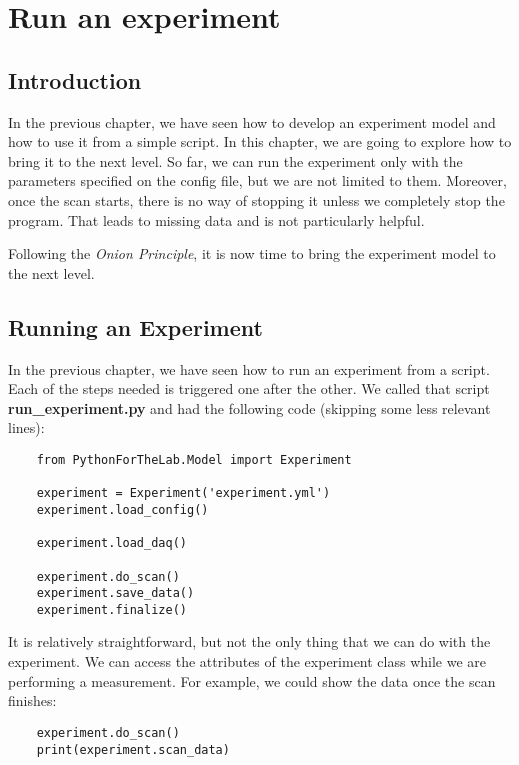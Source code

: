 \chapter{Run an experiment}\label{chapter:run-experiment}


\section{Introduction}
In the previous chapter, we have seen how to develop an experiment model and how to use it from a simple script. In this chapter, we are going to explore how to bring it to the next level. So far, we can run the experiment only with the parameters specified on the config file, but we are not limited to them. Moreover, once the scan starts, there is no way of stopping it unless we completely stop the program. That leads to missing data and is not particularly helpful.

Following the \emph{Onion Principle}, it is now time to bring the experiment model to the next level.


\section{Running an Experiment}\label{sec:running-experiment}
In the previous chapter, we have seen how to run an experiment from a script. Each of the steps needed is triggered one after the other. We called that script \textbf{run\_experiment.py} and had the following code (skipping some less relevant lines):

\begin{verbatim}
    from PythonForTheLab.Model import Experiment

    experiment = Experiment('experiment.yml')
    experiment.load_config()

    experiment.load_daq()

    experiment.do_scan()
    experiment.save_data()
    experiment.finalize()
\end{verbatim}

It is relatively straightforward, but not the only thing that we can do with the experiment. We can access the attributes of the experiment class while we are performing a measurement. For example, we could show the data once the scan finishes:

\begin{verbatim}
    experiment.do_scan()
    print(experiment.scan_data)
\end{verbatim}

